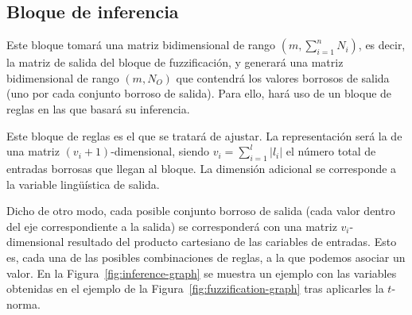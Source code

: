 \subsection{Bloque de inferencia}

Este bloque tomará una matriz bidimensional de rango $(m, \sum_{i=1}^n N_i)$, es decir, la matriz de salida del bloque de fuzzificación, y generará una matriz bidimensional de rango $(m, N_O)$ que contendrá los valores borrosos de salida (uno por cada conjunto borroso de salida). Para ello, hará uso de un bloque de reglas en las que basará su inferencia.

Este bloque de reglas es el que se tratará de ajustar. La representación será la de una matriz $(v_i + 1)$-dimensional, siendo $v_i = \sum_{i=1}^l \left\vert{l_i}\right\vert$ el número total de entradas borrosas que llegan al bloque. La dimensión adicional se corresponde a la variable lingüística de salida.

Dicho de otro modo, cada posible conjunto borroso de salida (cada valor dentro del eje correspondiente a la salida) se corresponderá con una matriz $v_i$-dimensional resultado del producto cartesiano de las cariables de entradas. Esto es, cada una de las posibles combinaciones de reglas, a la que podemos asociar un valor. En la Figura~\ref{fig:inference-graph} se muestra un ejemplo con las variables obtenidas en el ejemplo de la Figura~\ref{fig:fuzzification-graph} tras aplicarles la $t$-norma.


